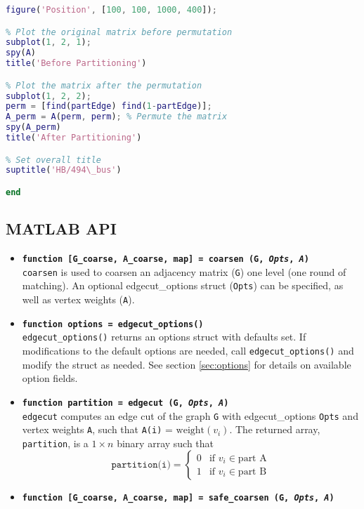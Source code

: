 \documentclass[letter]{article}
\begin{document}
\begin{lstlisting}[language=MATLAB]
figure('Position', [100, 100, 1000, 400]);

% Plot the original matrix before permutation
subplot(1, 2, 1);
spy(A)
title('Before Partitioning')

% Plot the matrix after the permutation
subplot(1, 2, 2);
perm = [find(partEdge) find(1-partEdge)];
A_perm = A(perm, perm); % Permute the matrix
spy(A_perm)
title('After Partitioning')

% Set overall title
suptitle('HB/494\_bus')

end
\end{lstlisting}

\subsection{MATLAB API}

\begin{itemize}
\item \textbf{\texttt{function [G\_coarse, A\_coarse, map] = coarsen (G, \textit{Opts}, \textit{A})}}\\
\texttt{coarsen} is used to coarsen an adjacency matrix (\texttt{G}) one level (one round of matching). An optional edgecut\_options struct (\texttt{Opts}) can be specified, as well as vertex weights (\texttt{A}).
\\
\item \textbf{\texttt{function options = edgecut\_options()}}\\
\texttt{edgecut\_options()} returns an options struct with defaults set. If modifications to the default options are needed, call \texttt{edgecut\_options()} and modify the struct as needed. See section \ref{sec:options} for details on available option fields.
\\
\item \textbf{\texttt{function partition = edgecut (G, \textit{Opts}, \textit{A})}}\\
\texttt{edgecut} computes an edge cut of the graph \texttt{G} with edgecut\_options \texttt{Opts} and vertex weights \texttt{A}, such that \texttt{A(i)} = $\text{weight}(v_i)$. The returned array, \texttt{partition}, is a $1 \times n$ binary array such that
\[
\texttt{partition(i)} = 
  \begin{cases} 
   0 & \text{if } v_i \in \text{part A} \\
   1 & \text{if } v_i \in \text{part B}
  \end{cases}
\]
\item \textbf{\texttt{function [G\_coarse, A\_coarse, map] = safe\_coarsen (G, \textit{Opts}, \textit{A})}}\\

\end{itemize}
\end{document}
